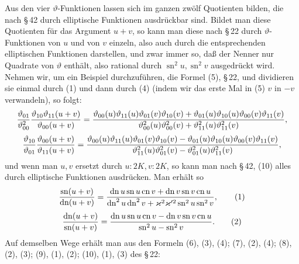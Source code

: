 \documentclass[11pt]{article}
\providecommand{\tht}{\vartheta}
\providecommand{\sn}{\operatorname{sn}}
\providecommand{\cn}{\operatorname{cn}}
\providecommand{\dn}{\operatorname{dn}}
\begin{document}
Aus den vier $\vartheta$-Funktionen lassen sich im ganzen zwölf Quotienten bilden, die nach \S\,42 durch elliptische Funktionen ausdrückbar sind. Bildet man diese Quotienten für das Argument $u+v$, so kann man diese nach \S\,22 durch $\vartheta$-Funktionen von $u$ und von $v$ einzeln, also auch durch die entsprechenden elliptischen Funktionen darstellen, und zwar immer so, daß der Nenner nur Quadrate von $\vartheta$ enthält, also rational durch $\sn^2u,\sn^2v$ ausgedrückt wird. Nehmen wir, um ein Beispiel durchzuführen, die Formel (5), \S\,22, und dividieren sie einmal durch (1) und dann durch (4) (indem wir das erste Mal in (5) $v$ in $-v$ verwandeln), so folgt:
\[
{\tht_{01}\over\tht_{00}^{2}}
{\tht_{10}\tht_{11}(u+v)\over\tht_{00}(u+v)}
=
{\tht_{00}(u)\tht_{11}(u)\tht_{01}(v)\tht_{10}(v)+
\tht_{01}(u)\tht_{10}(u)\tht_{00}(v)\tht_{11}(v)
\over
\tht_{00}^{2}(u)\tht_{00}^{2}(v)+\tht_{11}^{2}(u)\tht_{11}^{2}(v)},
\]
\[
{\tht_{10}\over\tht_{01}}
{\tht_{00}(u+v)\over\tht_{11}(u+v)}
=
{\tht_{00}(u)\tht_{11}(u)\tht_{01}(v)\tht_{10}(v)-
\tht_{01}(u)\tht_{10}(u)\tht_{00}(v)\tht_{11}(v)
\over
\tht_{11}^{2}(u)\tht_{01}^{2}(v)-\tht_{01}^{2}(u)\tht_{11}^{2}(v)},
\]
und wenn man $u,v$ ersetzt durch $u:2K,v:2K$, so kann man nach \S\,42, (10) alles durch elliptische Funktionen ausdrücken. Man erhält so
\begin{equation}
{\sn(u+v)\over\dn(u+v)}=
{\dn u\sn u\cn v+\dn v\sn v\cn u
\over \dn^2u\dn^2v+\varkappa^2\varkappa'^2\sn^2u\sn^2v},
\tag{1}
\end{equation}
\begin{equation}
{\dn(u+v)\over\sn(u+v)}=
{\dn u\sn u\cn v-\dn v\sn v\cn u
\over \sn^2u-\sn^2v}.
\tag{2}
\end{equation}
Auf demselben Wege erhält man aus den Formeln (6), (3), (4); (7), (2), (4); (8), (2), (3); (9), (1), (2); (10), (1), (3) des \S\,22:
\end{document}
